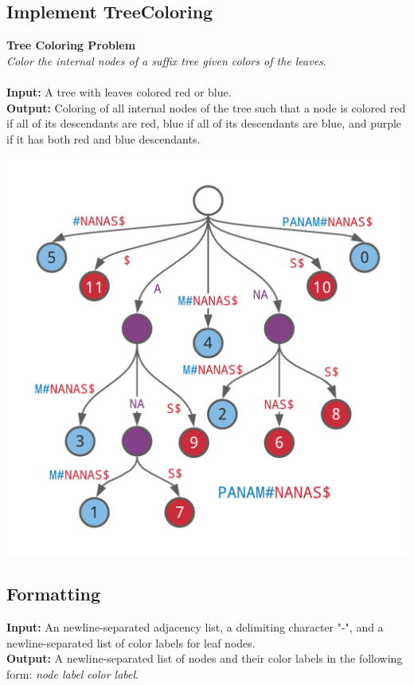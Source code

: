 \documentclass{article}
\begin{document}
\subsection{Implement TreeColoring}
\hline\vspace{5}
\noindent \textbf{Tree Coloring Problem}\\
\emph{Color the internal nodes of a suffix tree given colors of the leaves}.\\ \\
\textbf{Input:} A tree with leaves colored red or blue. \\
\textbf{Output:} Coloring of all internal nodes of the tree such that a node is colored red if all of its descendants are red, blue if all of its descendants are blue, and purple if it has both red and blue descendants.
\begin{center}
    \includegraphics[scale=0.2]{c9/logos/9P.png} 
\end{center}
\hline\vspace{5}

\subsection*{Formatting}
\textbf{Input:} An newline-separated adjacency list, a delimiting character "-", and a newline-separated list of color labels for leaf nodes.\\
\noindent \textbf{Output:} A newline-separated list of nodes and their color labels in the following form: \emph{node label} \emph{color label}.
\end{document}
